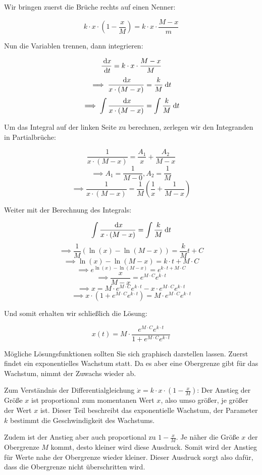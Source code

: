 \item Wir bringen zuerst die Brüche rechts auf einen Nenner:

$$k \cdot x \cdot (1-\frac{x}{M}) = k \cdot x \cdot \frac{M-x}{m}$$

Nun die Variablen trennen, dann integrieren:

$$\frac{\:\mathrm{d}{x}}{\:\mathrm{d}{t}} = k \cdot x \cdot \frac{M-x}{M}$$
$$\implies \frac{\:\mathrm{d}{x}}{x\cdot(M-x)} = \frac{k}{M} \:\mathrm{d}{t}$$
$$\implies \int \frac{\:\mathrm{d}{x}}{x\cdot(M-x)} = \int \frac{k}{M} \:\mathrm{d}{t}$$

Um das Integral auf der linken Seite zu berechnen, zerlegen wir den Integranden in Partialbrüche:

$$\frac{1}{x\cdot(M-x)} = \frac{A_1}{x} + \frac{A_2}{M-x}$$
$$\implies A_1 = \frac{1}{M-0}, A_2 = \frac{1}{M}$$
$$\implies \frac{1}{x\cdot(M-x)} = \frac{1}{M} \left(\frac{1}{x} + \frac{1}{M-x}\right)$$

Weiter mit der Berechnung des Integrals:

$$\int \frac{\:\mathrm{d}{x}}{x\cdot(M-x)} = \int \frac{k}{M} \:\mathrm{d}{t}$$
$$\implies \frac{1}{M}(\ln(x)-\ln(M-x)) = \frac{k}{M}t + C$$
$$\implies \ln(x)-\ln(M-x) = k\cdot t + M\cdot C$$
$$\implies e^{\ln(x)-\ln(M-x)} = e^{k\cdot t + M\cdot C}$$
$$\implies \frac{x}{M-x} = e^{M\cdot C} e^{k\cdot t}$$
$$\implies x = M \cdot e^{M\cdot C} e^{k\cdot t} - x \cdot e^{M\cdot C} e^{k\cdot t}$$
$$\implies x\cdot\left(1+e^{M\cdot C} e^{k\cdot t}\right) = M \cdot e^{M\cdot C} e^{k\cdot t}$$

Und somit erhalten wir schließlich die Lösung:

$$x(t) = M \cdot \frac{e^{M\cdot C} e^{k\cdot t}}{1+e^{M\cdot C} e^{k\cdot t}}$$

Mögliche Lösungsfunktionen sollten Sie sich graphisch darstellen lassen. Zuerst findet ein exponentielles Wachstum statt. Da es aber eine Obergrenze gibt für das Wachstum, nimmt der Zuwachs wieder ab.

Zum Verständnis der Differentialgleichung $\dot x= k \cdot x \cdot (1-\frac{x}{M})$: Der Anstieg der Größe $x$ ist proportional zum momentanen Wert $x$, also umso größer, je größer der Wert $x$ ist. Dieser Teil beschreibt das exponentielle Wachstum, der Parameter $k$ bestimmt die Geschwindigkeit des Wachstums.

Zudem ist der Anstieg aber auch proportional zu $1-\frac{x}{M}$. Je näher die Größe $x$ der Obergrenze $M$ kommt, desto kleiner wird diese Ausdruck. Somit wird der Anstieg für Werte nahe der Obergrenze wieder kleiner. Dieser Ausdruck sorgt also dafür, dass die Obergrenze nicht überschritten wird.

